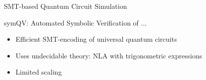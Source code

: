 \begin{refframe}{SMT-based Quantum Circuit Simulation}

\vspace{-3em}

\pause


\begin{block}{symQV: Automated Symbolic Verification of ... \cite{bauermarquart2023symqv}}
\begin{itemize}
\item<+-> Efficient SMT-encoding of \alert{universal} quantum circuits
\item<3-> Uses \alert{undecidable} theory: NLA with trigonometric expressions
\item<3-> Limited scaling
\end{itemize}
\end{block}

	
\end{refframe}




